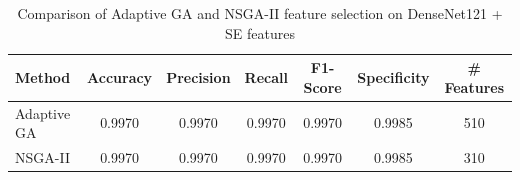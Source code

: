 \begin{table}[htbp]
\centering
\caption{Comparison of Adaptive GA and NSGA-II feature selection on DenseNet121 + SE features}
\label{tab:table6}
\begin{tabular}{lcccccc}
\toprule
Method & Accuracy & Precision & Recall & F1-Score & Specificity & \# Features \\
\midrule
Adaptive GA & 0.9970 & 0.9970 & 0.9970 & 0.9970 & 0.9985 & 510 \\
NSGA-II & 0.9970 & 0.9970 & 0.9970 & 0.9970 & 0.9985 & 310 \\
\bottomrule
\end{tabular}
\end{table}